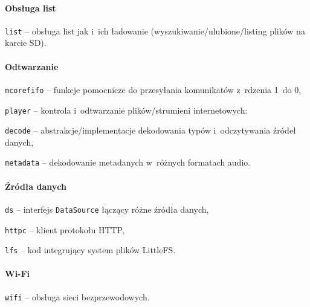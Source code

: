 \documentclass[polish]{aghengthesis}
\let\tempone\itemize
\let\temptwo\enditemize
\renewenvironment{itemize}{\tempone\setlength{\itemsep}{0cm}}{\temptwo}
\begin{document}
			\paragraph{Obsługa list}
				\begin{itemize}
					\item \lstinline|list| -- obsługa list jak i~ich ładowanie (wyszukiwanie/ulubione/listing plików na karcie SD).
				\end{itemize}
			
			\paragraph{Odtwarzanie}
				\begin{itemize}
					\item \lstinline|mcorefifo| -- funkcje pomocnicze do przesyłania komunikatów z~rdzenia 1~do 0,
					\item \lstinline|player| -- kontrola i~odtwarzanie plików/strumieni internetowych:
					\begin{itemize}
						\item \lstinline|decode| -- abstrakcje/implementacje dekodowania typów i~odczytywania źródeł danych,
						\item \lstinline|metadata| -- dekodowanie metadanych w~różnych formatach audio.
					\end{itemize}
				\end{itemize}
		
			\paragraph{Źródła danych}
				\begin{itemize}
					\item \lstinline|ds| -- interfejs \lstinline|DataSource| łączący różne źródła danych,
					\item \lstinline|httpc| -- klient protokołu HTTP,
					\item \lstinline|lfs| -- kod integrujący system plików LittleFS\textsuperscript{\cite{littlefs}}.
				\end{itemize}
			
			\paragraph{Wi-Fi}
				\begin{itemize}
					\item \lstinline|wifi| -- obsługa sieci bezprzewodowych.
				\end{itemize}
		
\end{document}
